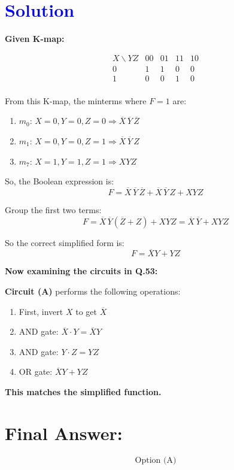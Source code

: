 \documentclass[a4paper,12pt]{article}
\begin{document}
 \section*{\textcolor{blue}{Solution}}
 
\textbf{Given K-map:}

\[
\begin{array}{c|cccc}
X \backslash YZ & 00 & 01 & 11 & 10 \\
\hline
0 & 1 & 1 & 0 & 0 \\
1 & 0 & 0 & 1 & 0 \\
\end{array}
\]

From this K-map, the minterms where \( F = 1 \) are:

\begin{enumerate}
    \item \( m_0 \): \( X = 0, Y = 0, Z = 0 \Rightarrow \overline{X} \, \overline{Y} \, \overline{Z} \)
    \item \( m_1 \): \( X = 0, Y = 0, Z = 1 \Rightarrow \overline{X} \, \overline{Y} \, Z \)
    \item \( m_7 \): \( X = 1, Y = 1, Z = 1 \Rightarrow X Y Z \)
\end{enumerate}

So, the Boolean expression is:
\[
F = \overline{X} \, \overline{Y} \, \overline{Z} + \overline{X} \, \overline{Y} \, Z + X Y Z
\]

Group the first two terms:
\[
F = \overline{X} \, \overline{Y} (\overline{Z} + Z) + X Y Z = \overline{X} \, \overline{Y} + X Y Z
\]

So the correct simplified form is:
\[
\boxed{F = \overline{X} Y + Y Z}
\]

\textbf{Now examining the circuits in Q.53:}

\textbf{Circuit (A)} performs the following operations:
\begin{enumerate}
    \item First, invert \( X \) to get \( \overline{X} \)
    \item AND gate: \( \overline{X} \cdot Y = \overline{X} Y \)
    \item AND gate: \( Y \cdot Z = Y Z \)
    \item OR gate: \( \overline{X} Y + Y Z \)
\end{enumerate}
\textbf{This matches the simplified function.}

\section*{Final Answer:}
\[
\boxed{\text{Option (A)}}
\]
\end{document}
